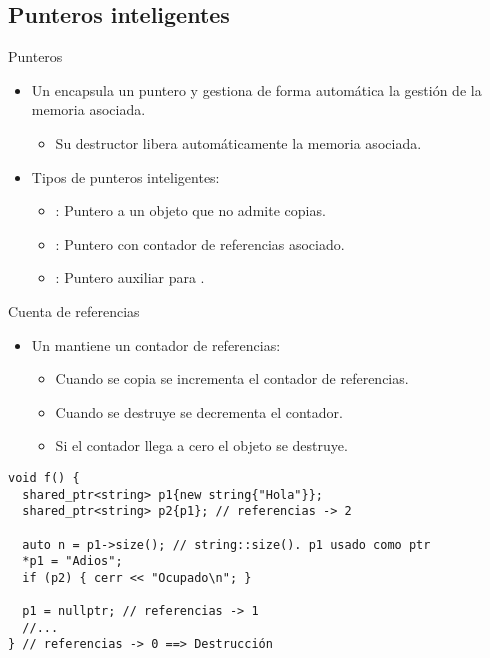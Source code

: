 \subsection{Punteros inteligentes}

\begin{frame}[t]{Punteros}
\begin{itemize}
  \item Un  encapsula un puntero y gestiona
        de forma automática la gestión de la memoria asociada.
    \begin{itemize}
      \item Su destructor libera automáticamente la memoria asociada.
    \end{itemize}

  \vfill\pause
  \item Tipos de punteros inteligentes:
    \begin{itemize}
      \item {}: Puntero a un objeto que no admite copias.
      \item {}: Puntero con contador de referencias asociado.
      \item {}: Puntero auxiliar para .
    \end{itemize}
\end{itemize}
\end{frame}


\begin{frame}[t,fragile]{Cuenta de referencias}
\begin{itemize}
  \item Un  mantiene un contador de referencias:
    \begin{itemize}
      \item Cuando se copia se incrementa el contador de referencias.
      \item Cuando se destruye se decrementa el contador.
      \item Si el contador llega a cero el objeto se destruye.
    \end{itemize}
\end{itemize}

\begin{lstlisting}
void f() {
  shared_ptr<string> p1{new string{"Hola"}};
  shared_ptr<string> p2{p1}; // referencias -> 2

  auto n = p1->size(); // string::size(). p1 usado como ptr
  *p1 = "Adios";
  if (p2) { cerr << "Ocupado\n"; }

  p1 = nullptr; // referencias -> 1
  //...
} // referencias -> 0 ==> Destrucción
\end{lstlisting}

\end{frame}


